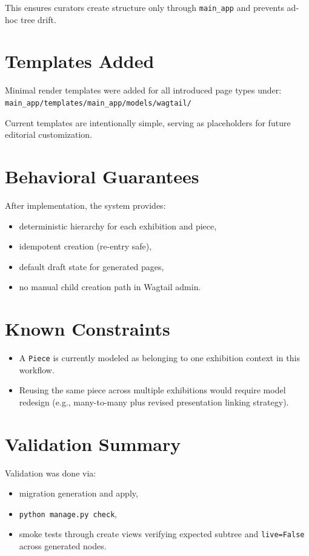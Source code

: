 \documentclass[11pt,a4paper]{article}
\begin{document}
This ensures curators create structure only through \texttt{main\_app} and prevents ad-hoc tree drift.

\section{Templates Added}
Minimal render templates were added for all introduced page types under:
\texttt{main\_app/templates/main\_app/models/wagtail/}

Current templates are intentionally simple, serving as placeholders for future editorial customization.

\section{Behavioral Guarantees}
After implementation, the system provides:
\begin{itemize}[leftmargin=*]
    \item deterministic hierarchy for each exhibition and piece,
    \item idempotent creation (re-entry safe),
    \item default draft state for generated pages,
    \item no manual child creation path in Wagtail admin.
\end{itemize}

\section{Known Constraints}
\begin{itemize}[leftmargin=*]
    \item A \texttt{Piece} is currently modeled as belonging to one exhibition context in this workflow.
    \item Reusing the same piece across multiple exhibitions would require model redesign (e.g., many-to-many plus revised presentation linking strategy).
\end{itemize}

\section{Validation Summary}
Validation was done via:
\begin{itemize}[leftmargin=*]
    \item migration generation and apply,
    \item \texttt{python manage.py check},
    \item smoke tests through create views verifying expected subtree and \texttt{live=False} across generated nodes.
\end{itemize}
\end{document}
